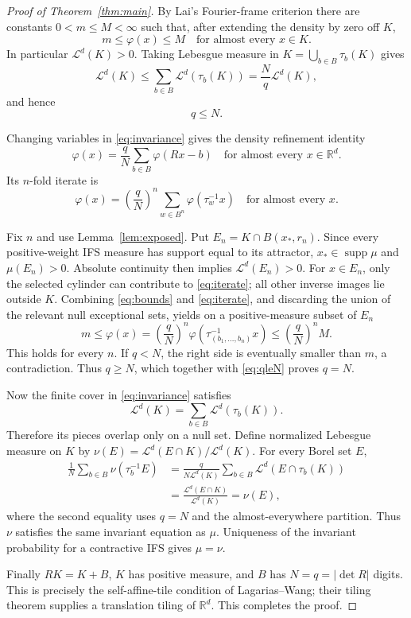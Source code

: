 \documentclass[11pt]{article}
\newcommand{\R}{\mathbb R}
\newcommand{\Leb}{\mathcal L^d}
\begin{document}
\begin{proof}[Proof of Theorem~\ref{thm:main}]
By Lai's Fourier-frame criterion there are constants $0<m\leq M<\infty$
such that, after extending the density by zero off $K$,
\begin{equation}\label{eq:bounds}
 m\leq\varphi(x)\leq M
 \quad\text{for almost every }x\in K.
\end{equation}
In particular $\Leb(K)>0$.  Taking Lebesgue measure in
$K=\bigcup_{b\in B}\tau_b(K)$ gives
\[
 \Leb(K)\leq\sum_{b\in B}\Leb(\tau_b(K))
 =\frac{N}{q}\Leb(K),
\]
and hence
\begin{equation}\label{eq:qleN}
 q\leq N.
\end{equation}

Changing variables in \eqref{eq:invariance} gives the density refinement
identity
\begin{equation}\label{eq:refinement}
 \varphi(x)=\frac qN\sum_{b\in B}\varphi(Rx-b)
 \quad\text{for almost every }x\in\R^d.
\end{equation}
Its $n$-fold iterate is
\begin{equation}\label{eq:iterate}
 \varphi(x)=\left(\frac qN\right)^n
 \sum_{w\in B^n}\varphi(\tau_w^{-1}x)
 \quad\text{for almost every }x.
\end{equation}

Fix $n$ and use Lemma~\ref{lem:exposed}.  Put
$E_n=K\cap B(x_*,r_n)$.  Since every positive-weight IFS measure has support
equal to its attractor, $x_*\in\operatorname{supp}\mu$ and
$\mu(E_n)>0$.  Absolute continuity then implies $\Leb(E_n)>0$.
For $x\in E_n$, only the selected cylinder can contribute to
\eqref{eq:iterate}; all other inverse images lie outside $K$.  Combining
\eqref{eq:bounds} and \eqref{eq:iterate}, and discarding the union of the
relevant null exceptional sets, yields on a positive-measure subset of
$E_n$
\[
 m\leq\varphi(x)
 =\left(\frac qN\right)^n
   \varphi(\tau_{(b_1,\ldots,b_n)}^{-1}x)
 \leq\left(\frac qN\right)^n M.
\]
This holds for every $n$.  If $q<N$, the right side is eventually smaller
than $m$, a contradiction.  Thus $q\geq N$, which together with
\eqref{eq:qleN} proves $q=N$.

Now the finite cover in \eqref{eq:invariance} satisfies
\[
 \Leb(K)=\sum_{b\in B}\Leb(\tau_b(K)).
\]
Therefore its pieces overlap only on a null set.  Define normalized
Lebesgue measure on $K$ by
$\nu(E)=\Leb(E\cap K)/\Leb(K)$.  For every Borel set $E$,
\begin{align*}
 \frac1N\sum_{b\in B}\nu(\tau_b^{-1}E)
 &=\frac{q}{N\Leb(K)}
   \sum_{b\in B}\Leb(E\cap\tau_b(K))\\
 &=\frac{\Leb(E\cap K)}{\Leb(K)}=\nu(E),
\end{align*}
where the second equality uses $q=N$ and the almost-everywhere partition.
Thus $\nu$ satisfies the same invariant equation as $\mu$.  Uniqueness of
the invariant probability for a contractive IFS gives $\mu=\nu$.

Finally $RK=K+B$, $K$ has positive measure, and $B$ has
$N=q=|\det R|$ digits.  This is precisely the self-affine-tile condition of
Lagarias--Wang; their tiling theorem supplies a translation tiling of
$\R^d$.  This completes the proof.
\end{proof}
\end{document}
